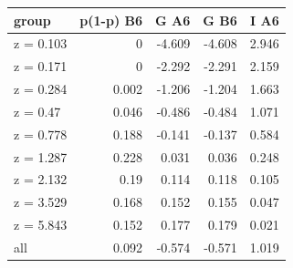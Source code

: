 \begin{tabular}{lrrrr}
\toprule
group & p(1-p) B6 & G A6 & G B6 & I A6 \\
\midrule
z = 0.103 & 0 & -4.609 & -4.608 & 2.946 \\
z = 0.171 & 0 & -2.292 & -2.291 & 2.159 \\
z = 0.284 & 0.002 & -1.206 & -1.204 & 1.663 \\
z = 0.47 & 0.046 & -0.486 & -0.484 & 1.071 \\
z = 0.778 & 0.188 & -0.141 & -0.137 & 0.584 \\
z = 1.287 & 0.228 & 0.031 & 0.036 & 0.248 \\
z = 2.132 & 0.19 & 0.114 & 0.118 & 0.105 \\
z = 3.529 & 0.168 & 0.152 & 0.155 & 0.047 \\
z = 5.843 & 0.152 & 0.177 & 0.179 & 0.021 \\
all & 0.092 & -0.574 & -0.571 & 1.019 \\
\bottomrule
\end{tabular}
